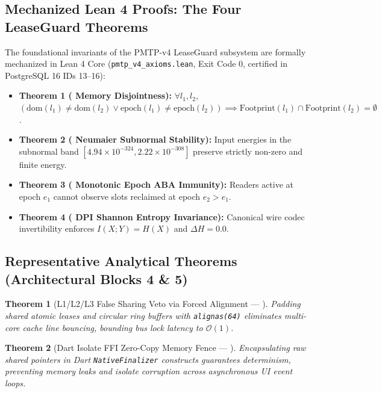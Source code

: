 \documentclass[journal,10pt,compsoc]{IEEEtran}
\theoremstyle{plain}
\newtheorem{theorem}{Theorem}
\theoremstyle{definition}
\begin{document}
\subsection{Mechanized Lean 4 Proofs: The Four LeaseGuard Theorems}
The foundational invariants of the PMTP-v4 LeaseGuard subsystem are formally mechanized in Lean 4 Core (\texttt{pmtp\_v4\_axioms.lean}, Exit Code 0, certified in PostgreSQL 16 IDs 13--16):
\begin{itemize}
    \item \textbf{Theorem 1 (\label{thm:polydim_lean_disjointness} Memory Disjointness):} $\forall l_1, l_2$, $(\mathrm{dom}(l_1) \neq \mathrm{dom}(l_2) \lor \mathrm{epoch}(l_1) \neq \mathrm{epoch}(l_2)) \implies \mathrm{Footprint}(l_1) \cap \mathrm{Footprint}(l_2) = \emptyset$.
    \item \textbf{Theorem 2 (\label{thm:polydim_lean_neumaier} Neumaier Subnormal Stability):} Input energies in the subnormal band $[4.94 \times 10^{-324}, 2.22 \times 10^{-308}]$ preserve strictly non-zero and finite energy.
    \item \textbf{Theorem 3 (\label{thm:polydim_lean_aba} Monotonic Epoch ABA Immunity):} Readers active at epoch $e_1$ cannot observe slots reclaimed at epoch $e_2 > e_1$.
    \item \textbf{Theorem 4 (\label{thm:polydim_lean_dpi} DPI Shannon Entropy Invariance):} Canonical wire codec invertibility enforces $I(X; Y) = H(X)$ and $\Delta H = 0.0$.
\end{itemize}

\subsection{Representative Analytical Theorems (Architectural Blocks 4 \& 5)}
\begin{theorem}[L1/L2/L3 False Sharing Veto via Forced Alignment --- \label{thm:polydim_1201}]
Padding shared atomic leases and circular ring buffers with \texttt{alignas(64)} eliminates multi-core cache line bouncing, bounding bus lock latency to $\mathcal{O}(1)$.
\end{theorem}

\begin{theorem}[Dart Isolate FFI Zero-Copy Memory Fence --- \label{thm:polydim_1571}]
Encapsulating raw shared pointers in Dart \texttt{NativeFinalizer} constructs guarantees determinism, preventing memory leaks and isolate corruption across asynchronous UI event loops.
\end{theorem}
\end{document}
